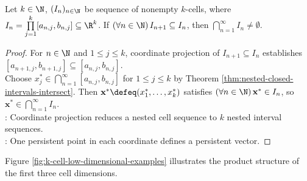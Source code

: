 \begin{theorem} \label{thm:nested-k-cells-intersect} \\
Let $k\in\N$, $(I_n)_{n\in\N}$ be sequence of nonempty $k$-cells, where $I_n=\prod\limits_{j=1}^{k}[a_{n,j},b_{n,j}]\subseteq\R^k$. If $(\forall n\in\N)\,I_{n+1}\subseteq I_n$, then $\bigcap\limits_{n=1}^{\infty}I_n\ne\emptyset$.
\begin{proof}
For $n\in\N$ and $1\leq j\leq k$, coordinate projection of $I_{n+1}\subseteq I_n$ establishes $[a_{n+1,j},b_{n+1,j}]\subseteq[a_{n,j},b_{n,j}]$.\\
Choose $x_j^*\in\bigcap\limits_{n=1}^{\infty}[a_{n,j},b_{n,j}]$ for $1\leq j\leq k$ by Theorem \ref{thm:nested-closed-intervals-intersect}. Then $\mathbf{x}^*\defeq(x_1^*,\ldots,x_k^*)$ satisfies $(\forall n\in\N)\,\mathbf{x}^*\in I_n$, so $\mathbf{x}^*\in\bigcap\limits_{n=1}^{\infty}I_n$.\\
: Coordinate projection reduces a nested cell sequence to $k$ nested interval sequences.\\
: One persistent point in each coordinate defines a persistent vector.
\end{proof}
\end{theorem}

Figure \ref{fig:k-cell-low-dimensional-examples} illustrates the product structure of the first three cell dimensions.
\begin{illustrationfigure}[H]
  \centering
  
  \caption{One-, two-, and three-factor cells are an interval, rectangle, and box; dashes mark a hidden edge.}
  \label{fig:k-cell-low-dimensional-examples}
\end{illustrationfigure}

